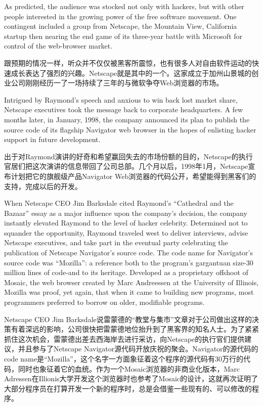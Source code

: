 \ifdefined\eng
As predicted, the audience was stocked not only with hackers, but with other people interested in the growing power of the free software movement. One contingent included a group from Netscape, the Mountain View, California startup then nearing the end game of its three-year battle with Microsoft for control of the web-browser market.
\fi

\ifdefined\chs
跟预期的情况一样，听众并不仅仅被黑客所震惊，也有很多人对自由软件运动的快速成长表达了强烈的兴趣。Netscape就是其中的一个。这家成立于加州山景城的创业公司刚刚经历一了一场持续了三年的与微软争夺Web浏览器的市场。
\fi

\ifdefined\eng
Intrigued by Raymond's speech and anxious to win back lost market share, Netscape executives took the message back to corporate headquarters. A few months later, in January, 1998, the company announced its plan to publish the source code of its flagship Navigator web browser in the hopes of enlisting hacker support in future development.
\fi

\ifdefined\chs
出于对Raymond演讲的好奇和希望赢回失去的市场份额的目的，Netscape的执行官居们把这次演讲的信息带回了公司总部。几个月以后，1998年1月，Netscape宣布计划把它的旗舰级产品Navigator Web浏览器的代码公开，希望能得到黑客们的支持，完成以后的开发。
\fi

\ifdefined\eng
When Netscape CEO Jim Barksdale cited Raymond's ``Cathedral and the Bazaar'' essay as a major influence upon the company's decision, the company instantly elevated Raymond to the level of hacker celebrity. Determined not to squander the opportunity, Raymond traveled west to deliver interviews, advise Netscape executives, and take part in the eventual party celebrating the publication of Netscape Navigator's source code. The code name for Navigator's source code was ``Mozilla'': a reference both to the program's gargantuan size-30 million lines of code-and to its heritage. Developed as a proprietary offshoot of Mosaic, the web browser created by Marc Andreessen at the University of Illinois, Mozilla was proof, yet again, that when it came to building new programs, most programmers preferred to borrow on older, modifiable programs.
\fi

\ifdefined\chs
Netscape CEO Jim Barksdale说雷蒙德的“教堂与集市”文章对于公司做出这样的决策有着深远的影响，公司很快把雷蒙德地位抬升到了黑客界的知名人士。为了紧紧抓住这次机会，雷蒙德出差去西海岸去进行采访，向Netscape的执行官们提供建议，并且参与了Netscape Navigator源代码开放庆祝的聚会。Navigator的源代码的code name是“Mozilla”，这个名字一方面象征着这个程序的源代码有30万行的代码，同时也象征着它的血统。作为一个Mosaic浏览器的非商业化版本，Marc Adressen在Illionis大学开发这个浏览器时也参考了Mosaic的设计，这就再次证明了大部分程序员在打算开发一个新的程序时，总是会借鉴一些现有的、可以修改的程序。
\fi

